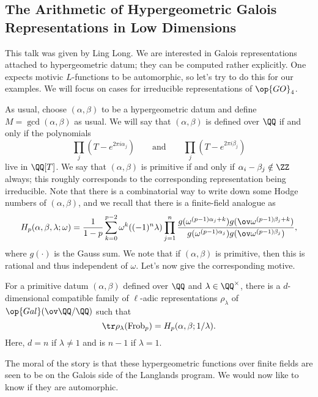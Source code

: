 \documentclass{article}
\begin{document}
\subsection{The Arithmetic of Hypergeometric Galois Representations in Low Dimensions}
This talk was given by Ling Long. We are interested in Galois representations attached to hypergeometric datum; they can be computed rather explicitly. One expects motivic $L$-functions to be automorphic, so let's try to do this for our examples. We will focus on cases for irreducible representations of $\op{GO}_4$.

As usual, choose $(\alpha,\beta)$ to be a hypergeometric datum and define $M=\gcd(\alpha,\beta)$ as usual. We will say that $(\alpha,\beta)$ is defined over $\QQ$ if and only if the polynomials
\[\prod_j\left(T-e^{2\pi i\alpha_j}\right)\qquad\text{and}\qquad\prod_j\left(T-e^{2\pi i\beta_j}\right)\]
live in $\QQ[T]$. We say that $(\alpha,\beta)$ is primitive if and only if $\alpha_i-\beta_j\notin\ZZ$ always; this roughly corresponds to the corresponding representation being irreducible. Note that there is a combinatorial way to write down some Hodge numbers of $(\alpha,\beta)$, and we recall that there is a finite-field analogue as
\[H_p(\alpha,\beta,\lambda;\omega)=\frac1{1-p}\sum_{k=0}^{p-2}\omega^k((-1)^n\lambda)\prod_{j=1}^n\frac{g(\omega^{(p-1)\alpha_j+k})g(\ov\omega^{(p-1)\beta_j+k})}{g(\omega^{(p-1)\alpha_j})g(\ov\omega^{(p-1)\beta_j})},\]
where $g(\cdot)$ is the Gauss sum. We note that if $(\alpha,\beta)$ is primitive, then this is rational and thus independent of $\omega$. Let's now give the corresponding motive.
\begin{theorem}
	For a primitive datum $(\alpha,\beta)$ defined over $\QQ$ and $\lambda\in\QQ^\times$, there is a $d$-dimensional compatible family of $\ell$-adic representations $\rho_{\lambda}$ of $\op{Gal}(\ov\QQ/\QQ)$ such that
	\[\tr\rho_\lambda(\mathrm{Frob}_p)=H_p(\alpha,\beta;1/\lambda).\]
	Here, $d=n$ if $\lambda\ne1$ and is $n-1$ if $\lambda=1$.
\end{theorem}
The moral of the story is that these hypergeometric functions over finite fields are seen to be on the Galois side of the Langlands program. We would now like to know if they are automorphic.
\end{document}
